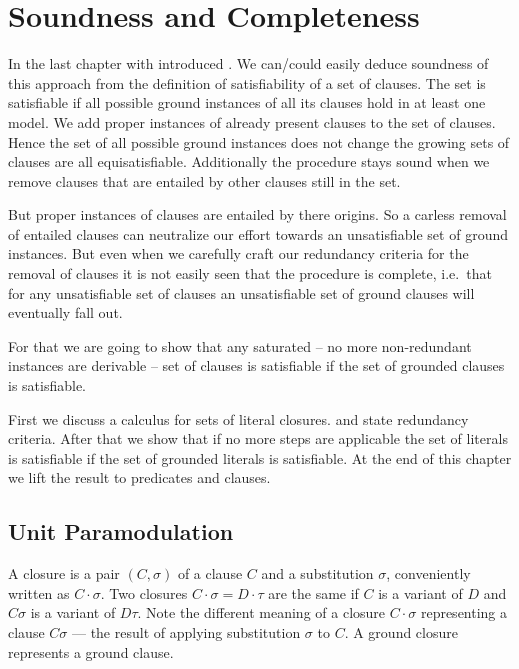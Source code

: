 
\chapter{Soundness and Completeness}

In the last chapter with introduced \InstGenEQ.
We can/could easily deduce soundness of this approach
from the definition of satisfiability of a set of clauses.
The set is satisfiable
if all possible ground instances of all its clauses
hold in at least one model.
We add proper instances of already present clauses to the set of clauses.
Hence the set of all possible ground instances does not change
the growing sets of clauses are all equisatisfiable.
Additionally the procedure stays sound when we remove clauses that are
entailed by other clauses still in the set.

But proper instances of clauses
are entailed by there origins. So a carless removal of entailed clauses
can neutralize our effort towards an unsatisfiable set of ground instances.
%
But even when we carefully craft our redundancy criteria for the removal of clauses
it is not easily seen that the procedure is complete,
i.e.~that for any unsatisfiable set of clauses an unsatisfiable
set of ground clauses will eventually fall out.

For that we are going to show
that any saturated -- no more non-redundant instances are derivable --
set of clauses is satisfiable if the set of grounded clauses is satisfiable.

First we discuss a calculus for sets of literal closures.
and state redundancy criteria.
After that we show that if no more steps are applicable
the set of literals is satisfiable
if the set of grounded literals is satisfiable.
At the end of this chapter we lift the result to predicates and clauses.





\section{Unit Paramodulation}
\begin{definition}
    A closure is a pair $(C,\sigma)$ of a clause $C$ and a substitution $\sigma$,
    conveniently written as $C\cdot\sigma$. Two closures $C\cdot\sigma = D\cdot\tau$
    are the same if $C$ is a variant of $D$ and $C\sigma$ is a variant of $D\tau$.
    Note the different meaning of a closure $C\cdot\sigma$ representing a clause $C\sigma$
    --- the result of applying substitution $\sigma$ to $C$.
    A ground closure represents a ground clause.
\end{definition}


